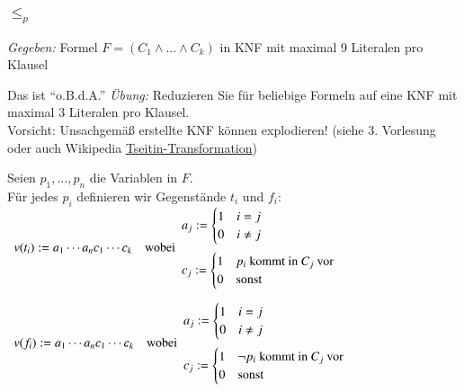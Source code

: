\documentclass[aspectratio=1610,onlymath]{beamer}
\begin{document}
\begin{frame}
  \frametitle{ $\leq_p$ }
    \emph{Gegeben: } Formel $F = (C_1 \wedge \dots \wedge C_k)$ in
  KNF mit maximal 9 Literalen pro Klausel\\
  {\tiny Das ist "`o.B.d.A."' \emph{Übung:} Reduzieren Sie  für beliebige Formeln auf eine KNF mit maximal 3 Literalen pro Klausel.\\
  Vorsicht: Unsachgemäß erstellte KNF können explodieren! (siehe 3. Vorlesung oder auch Wikipedia \underline{\href{https://de.wikipedia.org/wiki/Zeitin-Transformation}{Tseitin-Transformation}})
  
  }\pause\medskip
  Seien $p_1, \dots, p_n$ die Variablen in $F$.\\
  Für jedes $p_i$ definieren wir Gegenstände $t_i$ und $f_i$:\\[10pt]

  $\begin{array}{ll}
    v(t_i) := a_1 \cdots a_n c_1 \cdots c_k & {\text{wobei}}
    \begin{array}{l}
      a_j :=
      \begin{cases}
        1 & i=j\\
        0 & i\not=j
      \end{cases}\\[15pt]
      c_j :=
      \begin{cases}
        1 & p_i \text{ kommt in } C_j\text{ vor}\\
        0 & \text{sonst}
      \end{cases}
    \end{array}
  \end{array}$

  \bigskip\pause

  $\begin{array}{ll}
    v(f_i) := a_1 \cdots a_n c_1 \cdots c_k & \text{wobei} 
    \begin{array}{l}
      a_j :=
      \begin{cases}
        1 & i=j\\
        0 & i\not=j
      \end{cases}\\[15pt]
      c_j :=
      \begin{cases}
        1 & {\neg p_i} \text{ kommt in } C_j\text{ vor}\\
        0 & \text{sonst}
      \end{cases}
    \end{array}
  \end{array}$
\end{frame}
\end{document}
